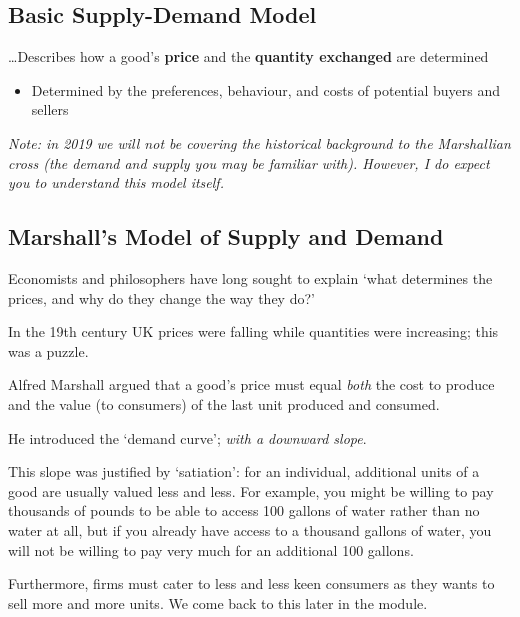 \documentclass[]{article}
\providecommand{\tightlist}{%
  \setlength{\itemsep}{0pt}\setlength{\parskip}{0pt}}
\begin{document}
\hypertarget{basic-supply-demand-model}{%
\subsection{Basic Supply-Demand Model}\label{basic-supply-demand-model}}

\ldots Describes how a good's \textbf{price} and the \textbf{quantity
exchanged} are determined

\begin{itemize}
\tightlist
\item
  Determined by the preferences, behaviour, and costs of potential
  buyers and sellers
\end{itemize}

\emph{Note: in 2019 we will not be covering the historical background to
the Marshallian cross (the demand and supply you may be familiar with).
However, I do expect you to understand this model itself.}

\hypertarget{marshalls-model-of-supply-and-demand}{%
\subsection{Marshall's Model of Supply and
Demand}\label{marshalls-model-of-supply-and-demand}}

Economists and philosophers have long sought to explain `what determines
the prices, and why do they change the way they do?'

In the 19th century UK prices were falling while quantities were
increasing; this was a puzzle.

Alfred Marshall argued that a good's price must equal \emph{both} the
cost to produce and the value (to consumers) of the last unit produced
and consumed.

He introduced the `demand curve'; \emph{with a downward slope}.

This slope was justified by `satiation': for an individual, additional
units of a good are usually valued less and less. For example, you might
be willing to pay thousands of pounds to be able to access 100 gallons
of water rather than no water at all, but if you already have access to
a thousand gallons of water, you will not be willing to pay very much
for an additional 100 gallons.

Furthermore, firms must cater to less and less keen consumers as they
wants to sell more and more units. We come back to this later in the
module.

\bigskip
\end{document}
